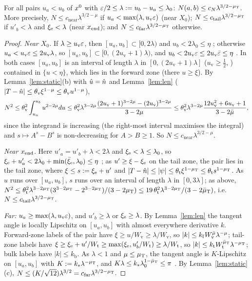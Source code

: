 \begin{lemma}\label{lem:Nbound}
For all pairs $u_a<u_b$ of $x^0$ with $\varepsilon/2\le\lambda:=u_b-u_a\le\lambda_0$: $N(a,b)\le c_N\lambda^{3/2-\mu_{\mathrm T}}$. More precisely,
$N\le c_{\mathrm{near}}\lambda^{3/2-\mu}$ if $u_a<\max(\lambda,u_{\mathrm v}\varepsilon)$ \textup(near $X_0$\textup);
$N\le c_{\mathrm{tail}}\lambda^{3/2-\mu_{\mathrm T}}$ if $u'_b<\lambda$ and $\xi_{\mathrm e}<\lambda$ \textup(near $x_{\mathrm{end}}$\textup); and
$N\le c_{\mathrm{far}}\lambda^{3/2-\mu_{\mathrm T}}$ otherwise.
\end{lemma}

\begin{proof}
\emph{Near $X_0$.} If $\lambda\ge u_{\mathrm v}\varepsilon$, then $[u_a,u_b]\subset[0,2\lambda)$ and $u_b<2\lambda_0\le\eta$ ; otherwise
$u_a<u_{\mathrm v}\varepsilon\le2u_{\mathrm v}\lambda$, so $[u_a,u_b]\subset[0,(2u_{\mathrm v}+1)\lambda)$, and $u_b<2u_{\mathrm v}\varepsilon\le
2u_{\mathrm v}\bar\varepsilon\le\eta$ . In both cases $[u_a,u_b]$ is an interval of length $\lambda$ in
$[0,(2u_{\mathrm v}+1)\lambda]$ ($u_{\mathrm v}\ge\frac12$, ) contained in $\{u<\eta\}$, which lies in the forward zone
(there $u\ge\xi$). By Lemma~\ref{lem:static}(b) with $\hat u=\hat n$ and Lemma~\ref{lem:len} ($|T-\hat n|\le\theta_{\mathrm v}\xi^{1-\mu}\le
\theta_{\mathrm v}u^{1-\mu}$),
\[
N^2\le\theta_{\mathrm v}^2\int_{u_a}^{u_b}u^{2-2\mu}du\le\theta_{\mathrm v}^2\lambda^{3-2\mu}
\frac{(2u_{\mathrm v}+1)^{3-2\mu}-(2u_{\mathrm v})^{3-2\mu}}{3-2\mu}\le\theta_{\mathrm v}^2\lambda^{3-2\mu}\frac{12u_{\mathrm v}^2+6u_{\mathrm v}+1}{3-2\bar\mu},
\]
since the integrand is increasing (the right-most interval maximises the integral) and $s\mapsto A^s-B^s$ is non-decreasing for
$A>B\ge1$. So $N\le c_{\mathrm{near}}\lambda^{3/2-\mu}$.

\emph{Near $x_{\mathrm{end}}$.} Here $u'_a=u'_b+\lambda<2\lambda$ and $\xi_{\mathrm e}<\lambda\le\lambda_0$, so $\xi_{\mathrm e}+u'_a<2\lambda_0+\min(\bar\xi_{\mathrm e},\lambda_0)
\le\eta$ ; as $u'\ge\xi-\xi_{\mathrm e}$ on the tail zone, the pair lies in the tail zone, where $\xi\le s:=\xi_{\mathrm e}+u'$ and
$|T-\hat n|\le|\psi|\le\theta_{\mathrm t}\xi^{1-\mu_{\mathrm T}}\le\theta_{\mathrm t}s^{1-\mu_{\mathrm T}}$. As $u$ runs over $[u_a,u_b]$, $s$ runs over an interval
of length $\lambda$ in $[0,3\lambda]$; as above,
$N^2\le\theta_{\mathrm t}^2\lambda^{3-2\mu_{\mathrm T}}(3^{3-2\mu_{\mathrm T}}-2^{3-2\mu_{\mathrm T}})/(3-2\mu_{\mathrm T})\le19\,\theta_{\mathrm t}^2\lambda^{3-2\mu_{\mathrm T}}/(3-2\bar\mu_{\mathrm T})$, i.e.\
$N\le c_{\mathrm{tail}}\lambda^{3/2-\mu_{\mathrm T}}$.

\emph{Far:} $u_a\ge\max(\lambda,u_{\mathrm v}\varepsilon)$, and $u'_b\ge\lambda$ or $\xi_{\mathrm e}\ge\lambda$. By Lemma~\ref{lem:len} the tangent angle is
locally Lipschitz on $[u_a,u_b]$ with almost everywhere derivative $k$. Forward-zone labels of the pair have $\xi\ge u/W_{\mathrm v}\ge
\lambda/W_{\mathrm v}$, so $|k|\le k_{\mathrm f}W_{\mathrm v}^{\bar\mu}\lambda^{-\mu}$; tail-zone labels have
$\xi\ge\xi_{\mathrm e}+u'/W_{\mathrm t}\ge\max(\xi_{\mathrm e},u'_b/W_{\mathrm t})\ge\lambda/W_{\mathrm t}$, so $|k|\le k_{\mathrm t}W_{\mathrm t}^{\bar\mu_{\mathrm T}}\lambda^{-\mu_{\mathrm T}}$;
bulk labels have $|k|\le k_{\mathrm b}$. As $\lambda<1$ and $\mu\le\mu_{\mathrm T}$, the tangent angle is $K$-Lipschitz on $[u_a,u_b]$ with
$K:=k_*\lambda^{-\mu_{\mathrm T}}$, and $K\lambda\le k_*\lambda_0^{1-\bar\mu_{\mathrm T}}\le\pi$ \hyptag{SC45}. By Lemma~\ref{lem:static}(c),
$N\le(K/\sqrt{12})\lambda^{3/2}=c_{\mathrm{far}}\lambda^{3/2-\mu_{\mathrm T}}$.


\end{proof}
